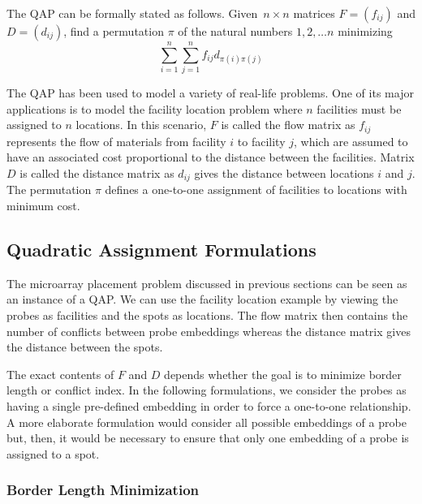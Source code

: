 \documentclass{bioinfo}
\begin{document}
The QAP can be formally stated as follows. Given~$n \times n$ matrices $F = (f_{ij})$ and $D = (d_{ij})$, find a permutation $\pi$ of the natural numbers $1, 2, \ldots n$ minimizing
\begin{equation}
\label{eq:qap_def}
\sum_{i=1}^{n} \sum_{j=1}^{n} f_{ij} d_{\pi(i)\pi(j)}
\end{equation}

The QAP has been used to model a variety of real-life problems. One of its major applications is to model the facility location problem where $n$ facilities must be assigned to $n$ locations. In this scenario, $F$ is called the flow matrix as $f_{ij}$ represents the flow of materials from facility $i$ to facility $j$, which are assumed to have an associated cost proportional to the distance between the facilities. Matrix $D$ is called the distance matrix as $d_{ij}$ gives the distance between locations $i$ and $j$. The permutation $\pi$ defines a one-to-one assignment of facilities to locations with minimum cost.

\subsection{Quadratic Assignment Formulations}
\label{sec:qap_form}

The microarray placement problem discussed in previous sections can be seen as an instance of a QAP. We can use the facility location example by viewing the probes as facilities and the spots as locations. The flow matrix then contains the number of conflicts between probe embeddings whereas the distance matrix gives the distance between the spots.

The exact contents of $F$ and $D$ depends whether the goal is to minimize border length or conflict index. In the following formulations, we consider the probes as having a single pre-defined embedding in order to force a one-to-one relationship. A more elaborate formulation would consider all possible embeddings of a probe but, then, it would be necessary to ensure that only one embedding of a probe is assigned to a spot.

\subsubsection{Border Length Minimization}
\end{document}

